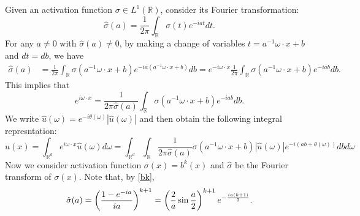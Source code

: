 \iffalse
Given an activation function $\sigma\in L^1(\mathbb R)$, consider its Fourier transformation:
\begin{equation}
  \label{Fsigma}
\hat \sigma(a) = \frac{1}{2\pi}\int_{\mathbb{R}} \sigma(t)e^{-iat}dt. 
\end{equation}
For any $a\neq 0$ with $\hat \sigma(a)\neq 0$, by making a change of variables 
$t = a^{-1}\omega\cdot x + b$ and $dt = db$, we have
 \begin{equation}
 \begin{aligned}
\hat{\sigma}(a)&=\frac{1}{2\pi}\int_{\mathbb{R}}\sigma(a^{-1}\omega\cdot x+b)e^{-ia( a^{-1}\omega\cdot x+b)}db = e^{-i\omega \cdot x}\frac{1}{2\pi}\int_{\mathbb{R}}\sigma(a^{-1} \omega\cdot x+b)e^{-iab}db.
 \end{aligned}
 \end{equation}
This implies that
\begin{equation}\label{FourierExp}
 e^{i\omega \cdot x} = \frac{1}{2\pi\hat{\sigma}(a)}\int_{\mathbb{R}}\sigma(a^{-1}\omega\cdot x+b)e^{-iab}db.
\end{equation}
We write $ \hat{u}(\omega) = e^{-i\theta(\omega)} | \hat{u}(\omega)|$
and then obtain the following integral represntation:
\begin{equation}\label{integral_representation01}
u(x) = \int_{\mathbb{R}^d} e^{i\omega\cdot x}\hat{u}(\omega)d\omega = 
\int_{\mathbb{R}^d}\int_\mathbb{R}\frac{1}{2\pi\hat{\sigma}(a)}
\sigma\left(a^{-1} \omega\cdot x+b\right)|\hat{u}(\omega)|e^{-i(ab+\theta(\omega))}dbd\omega
\end{equation}
Now we consider activation function $\sigma(x)=b^k(x)$ and $\hat \sigma$ be the
Fourier transform of $\sigma(x)$. Note that, by \eqref{bk}, 
\begin{align}\label{splineFourier}
\hat{\sigma}(a)=\left({1-e^{-ia}\over ia}\right)^{k+1}=\left({2\over a}\sin {a\over 2}\right)^{k+1}e^{-{ia(k+1)\over 2}}.
\end{align}

